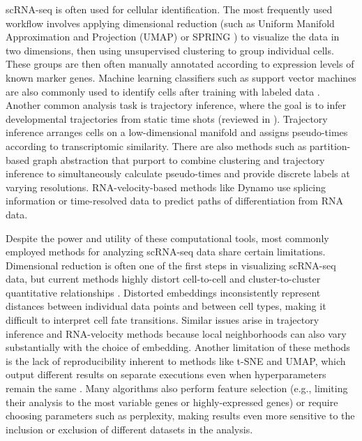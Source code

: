 \documentclass[vruler,JEB]{COB}%
\begin{document}
scRNA-seq is often used for cellular identification. The most frequently used workflow involves applying dimensional reduction (such as Uniform Manifold Approximation and Projection (UMAP) \citep{mcinnes_umap_2018} or SPRING \citep{weinreb_spring_2018}) to visualize the data in two dimensions, then using unsupervised clustering to group individual cells. These groups are then often manually annotated according to expression levels of known marker genes. Machine learning classifiers such as support vector machines are also commonly used to identify cells after training with labeled data \citep{abdelaal_comparison_2019}. Another common analysis task is trajectory inference, where the goal is to infer developmental trajectories from static time shots (reviewed in \citep{saelens2019comparison,wagner2020lineage}). Trajectory inference arranges cells on a low-dimensional manifold and assigns pseudo-times according to transcriptomic similarity. There are also methods such as partition-based graph abstraction \citep{wolf_paga_2019} that purport to combine clustering and trajectory inference to simultaneously calculate pseudo-times and provide discrete labels at varying resolutions. RNA-velocity-based methods like Dynamo \citep{qiu2022mapping} use splicing information or time-resolved data to predict paths of differentiation from RNA data.

Despite the power and utility of these computational tools, most commonly employed methods for analyzing scRNA-seq data share certain limitations. Dimensional reduction is often one of the first steps in visualizing scRNA-seq data, but current methods highly distort cell-to-cell and cluster-to-cluster quantitative relationships \citep{chari_specious_2021}. Distorted embeddings inconsistently represent distances between individual data points and between cell types, making it difficult to interpret cell fate transitions. Similar issues arise in trajectory inference and RNA-velocity methods because local neighborhoods can also vary substantially with the choice of embedding. Another limitation of these methods is the lack of reproducibility inherent to methods like t-SNE and UMAP, which output different results on separate executions even when hyperparameters remain the same \citep{wattenberg_how_2016}. Many algorithms also perform feature selection (e.g., limiting their analysis to the most variable genes or highly-expressed genes) or require choosing parameters such as perplexity, making results even more sensitive to the inclusion or exclusion of different datasets in the analysis. 
\end{document}
